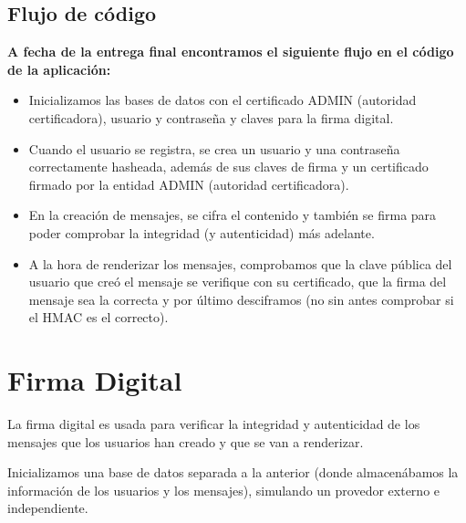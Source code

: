 \documentclass[a4paper,11pt]{article}
\begin{document}
\vspace{0.5cm}

\subsection{Flujo de código}
\textbf{A fecha de la entrega final encontramos el siguiente flujo en el código de la aplicación:} 
\begin{itemize}
    \item Inicializamos las bases de datos con el certificado ADMIN (autoridad certificadora), usuario y contraseña y claves para la firma digital.
    \item Cuando el usuario se registra, se crea un usuario y una contraseña correctamente hasheada, además de sus claves de firma y un certificado firmado por la entidad ADMIN (autoridad certificadora).
    \item En la creación de mensajes, se cifra el contenido y también se firma para poder comprobar la integridad (y autenticidad) más adelante.
    \item A la hora de renderizar los mensajes, comprobamos que la clave pública del usuario que creó el mensaje se verifique con su certificado, que la firma del mensaje sea la correcta y por último desciframos (no sin antes comprobar si el HMAC es el correcto).
\end{itemize}

\section{Firma Digital}
\label{sec:firmaDigital}
La firma digital es usada para verificar la integridad y autenticidad de los mensajes que los usuarios han creado y que se van a renderizar. 

Inicializamos una base de datos separada a la anterior (donde almacenábamos la información de los usuarios y los mensajes), simulando un provedor externo e independiente. 
\end{document}
